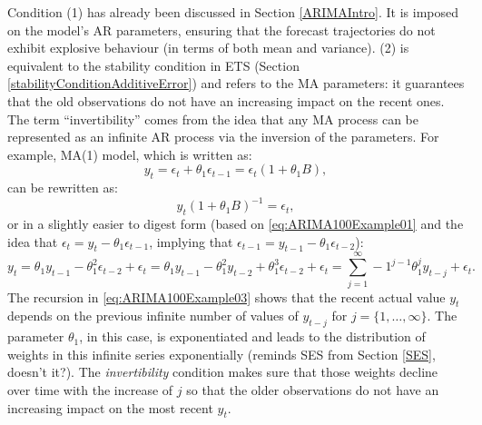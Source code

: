 \documentclass[]{book}
\theoremstyle{definition}
\theoremstyle{definition}
\theoremstyle{definition}
\theoremstyle{definition}
\theoremstyle{remark}
\begin{document}
Condition (1) has already been discussed in Section \ref{ARIMAIntro}. It is imposed on the model's AR parameters, ensuring that the forecast trajectories do not exhibit explosive behaviour (in terms of both mean and variance). (2) is equivalent to the stability condition in ETS (Section \ref{stabilityConditionAdditiveError}) and refers to the MA parameters: it guarantees that the old observations do not have an increasing impact on the recent ones. The term ``invertibility'' comes from the idea that any MA process can be represented as an infinite AR process via the inversion of the parameters. For example, MA(1) model, which is written as:
\begin{equation}
  y_t = \epsilon_t + \theta_1 \epsilon_{t-1} = \epsilon_t (1 + \theta_1 B) ,
  \label{eq:ARIMA100Example01}
\end{equation}
can be rewritten as:
\begin{equation}
  y_t (1 + \theta_1 B)^{-1} = \epsilon_t,
  \label{eq:ARIMA100Example02}
\end{equation}
or in a slightly easier to digest form (based on \eqref{eq:ARIMA100Example01} and the idea that \(\epsilon_{t} = y_{t} -\theta_1 \epsilon_{t-1}\), implying that \(\epsilon_{t-1} = y_{t-1} -\theta_1 \epsilon_{t-2}\)):
\begin{equation}
  y_t = \theta_1 y_{t-1} -\theta_1^2 \epsilon_{t-2} + \epsilon_t = \theta_1 y_{t-1} -\theta_1^2 y_{t-2} + \theta_1^3 \epsilon_{t-2} + \epsilon_t = \sum_{j=1}^\infty -1^{j-1} \theta_1^j y_{t-j} + \epsilon_t.
  \label{eq:ARIMA100Example03}
\end{equation}
The recursion in \eqref{eq:ARIMA100Example03} shows that the recent actual value \(y_t\) depends on the previous infinite number of values of \(y_{t-j}\) for \(j=\{1,\dots,\infty\}\). The parameter \(\theta_1\), in this case, is exponentiated and leads to the distribution of weights in this infinite series exponentially (reminds SES from Section \ref{SES}, doesn't it?). The \emph{invertibility} condition makes sure that those weights decline over time with the increase of \(j\) so that the older observations do not have an increasing impact on the most recent \(y_t\).
\end{document}
